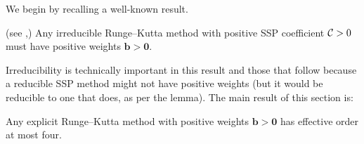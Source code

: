 %
We begin by recalling a well-known result.
\begin{lemma}\label{lem:positive_b}(see \cite[Theorem~4.2]{Kraaijevanger1991},\cite[Lemma 4.2]{Ruuth2002})
	Any irreducible Runge--Kutta method with positive SSP coefficient $\mathcal{C}>0$
	must have positive weights $\bm{b} > \bm{0}$.
\end{lemma}

Irreducibility \cite{dahlquist2006} is technically important in this
result and those that follow because a reducible SSP method might not
have positive weights (but it would be reducible to one that does, as
per the lemma).
The main result of this section is:
\begin{theorem}\label{thm:effective_barrier}
	Any explicit Runge--Kutta method with positive weights $\bm{b} > \bm{0}$ 
	has effective order at most four.
\end{theorem}


